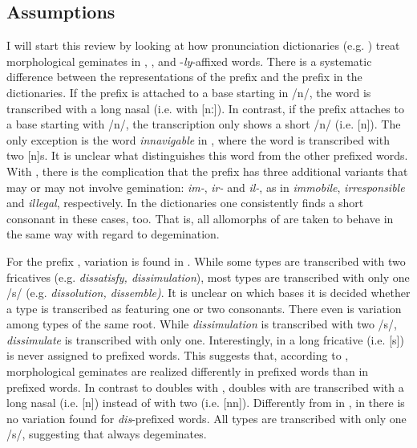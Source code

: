 \subsection{Assumptions } \label{assumption gem English}
I will start this review by looking at how pronunciation dictionaries (e.g. \citealt{Kenyon.1953, Roach.2011, Wells.2008}) treat morphological geminates in , ,  and \hbox{-}\textit{ly}-affixed words.  There is a systematic difference between the representations of the prefix  and the prefix  in the dictionaries. If the prefix  is attached to a base starting in /n/, the word is transcribed with a long nasal (i.e. with [nː]). In contrast, if the prefix  attaches to a base starting with /n/, the transcription only shows a short /n/ (i.e. [n]). The only exception is the word \textit{innavigable} in \citet{Roach.2011}, where the word is transcribed with two [n]s. It is unclear what distinguishes this word from the other prefixed words. 
  With , there is the complication that the prefix has three additional variants that may or may not involve gemination: \textit{im-}, \textit{ir-} and \textit{il-}, as in \textit{immobile}, \textit{irresponsible} and \textit{illegal}, respectively. In the dictionaries one consistently finds a short consonant in these cases, too. That is, all allomorphs of  are taken to behave in the same way with regard to degemination.
  
 For the prefix , variation is found in \cite{Roach.2011}. While some types are transcribed with two fricatives (e.g. \textit{dissatisfy, dissimulation}), most types are transcribed with only one /s/ (e.g. \textit{dissolution, dissemble)}. It is unclear on which bases it is decided whether a type is transcribed as featuring one or two consonants. There even is variation among types of the same root. While \textit{dissimulation} is transcribed with two /s/, \textit{dissimulate} is transcribed with only one. Interestingly, in \cite{Roach.2011}  a long fricative (i.e. [s\textlengthmark]) is never assigned to prefixed words. This suggests that, according to \cite{Roach.2011}, morphological geminates are realized differently in prefixed words than in prefixed words. In contrast to doubles with , doubles with  are transcribed with a long nasal (i.e. [n\textlengthmark])  instead of with two (i.e. [nn]).
 Differently from in \cite{Roach.2011}, in \cite{Wells.2008} there is no variation found for \textit{dis}-prefixed words. All types are transcribed with only one /s/, suggesting that  always degeminates. 
  
